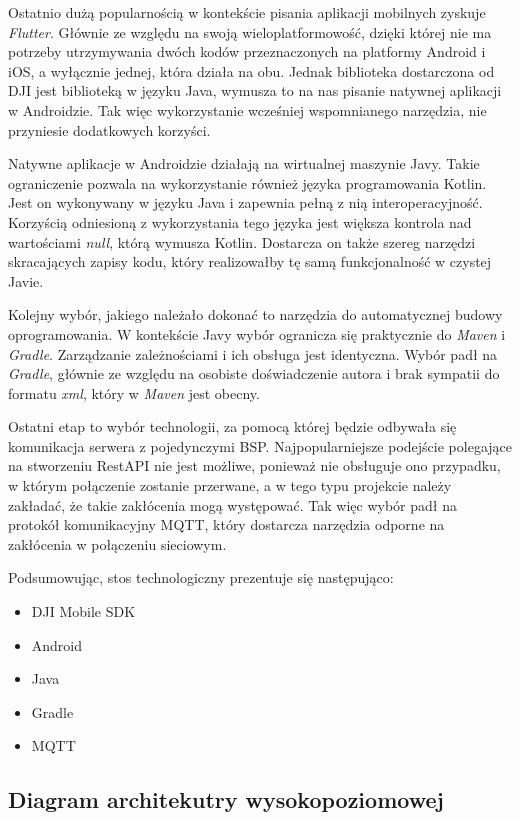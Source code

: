Ostatnio dużą popularnością w kontekście pisania aplikacji mobilnych zyskuje \textit{Flutter}. Głównie ze względu na swoją wieloplatformowość, dzięki której nie ma potrzeby utrzymywania dwóch kodów przeznaczonych na platformy Android i iOS, a wyłącznie jednej, która działa na obu. Jednak biblioteka dostarczona od DJI jest biblioteką w języku Java, wymusza to na nas pisanie natywnej aplikacji w Androidzie. Tak więc wykorzystanie wcześniej wspomnianego narzędzia, nie przyniesie dodatkowych korzyści.

Natywne aplikacje w Androidzie działają na wirtualnej maszynie Javy. Takie ograniczenie pozwala na wykorzystanie również języka programowania Kotlin. Jest on wykonywany w języku Java i zapewnia pełną z nią interoperacyjność. Korzyścią odniesioną z wykorzystania tego języka jest większa kontrola nad wartościami \textit{null}, którą wymusza Kotlin. Dostarcza on także szereg narzędzi skracających zapisy kodu, który realizowałby tę samą funkcjonalność w czystej Javie.

Kolejny wybór, jakiego należało dokonać to narzędzia do automatycznej budowy oprogramowania. W kontekście Javy wybór ogranicza się praktycznie do \textit{Maven} i \textit{Gradle}. Zarządzanie zależnościami i ich obsługa jest identyczna. Wybór padł na \textit{Gradle}, głównie ze względu na osobiste doświadczenie autora i brak sympatii do formatu \textit{xml}, który w \textit{Maven} jest obecny.

Ostatni etap to wybór technologii, za pomocą której będzie odbywała się komunikacja serwera z pojedynczymi BSP. Najpopularniejsze podejście polegające na stworzeniu RestAPI nie jest możliwe, ponieważ nie obsługuje ono przypadku, w którym połączenie zostanie przerwane, a w tego typu projekcie należy zakładać, że takie zakłócenia mogą występować. Tak więc wybór padł na protokół komunikacyjny MQTT, który dostarcza narzędzia odporne na zakłócenia w połączeniu sieciowym.

Podsumowując, stos technologiczny prezentuje się następująco:
\begin{itemize}
    \setlength\itemsep{1mm} %
  \item DJI Mobile SDK
  \item Android
  \item Java
  \item Gradle
  \item MQTT
\end{itemize}

\newpage
\subsection{Diagram architekutry wysokopoziomowej}

